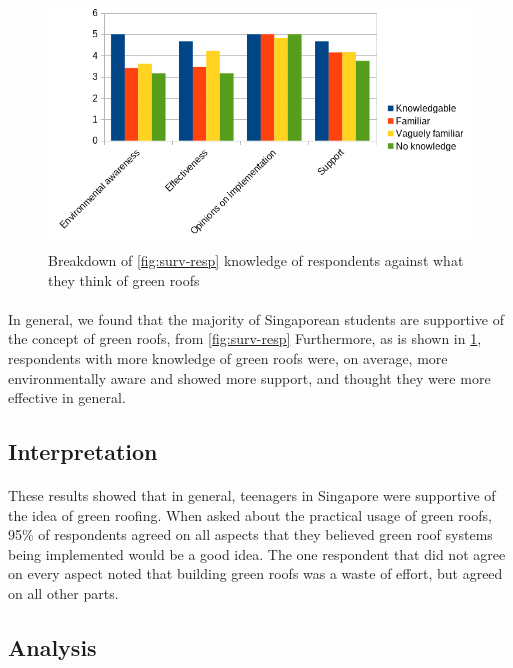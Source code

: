 \documentclass{article}
\begin{document}
\begin{multicols}{2}
  \begin{figure}
    \includegraphics[width=\linewidth]{knowledge-opinions.png}
    \caption{
      Breakdown of \cref{fig:surv-resp} knowledge of respondents
      against what they think of green roofs
    }
    \label{fig:know-opn}
  \end{figure}

  \paragraph{} In general, we found that the majority of Singaporean
  students are supportive of the concept of green roofs, from
  \cref{fig:surv-resp} Furthermore, as is shown in \cref{fig:know-opn},
  respondents with more knowledge of green roofs were, on average, more
  environmentally aware and showed more support, and thought they were
  more effective in general.


  \subsection{Interpretation}
  \paragraph{} These results showed that in general, teenagers in
  Singapore were supportive of the idea of green roofing. When asked about
  the practical usage of green roofs, 95\% of respondents agreed on all
  aspects that they believed green roof systems being implemented would
  be a good idea. The one respondent that did not agree on every aspect
  noted that building green roofs was a waste of effort, but agreed on
  all other parts. 

  \subsection{Analysis}

\end{multicols}
\end{document}
